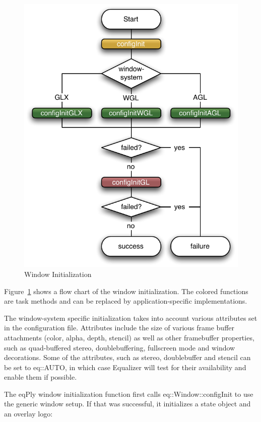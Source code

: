 \documentclass[10pt,a4]{scrartcl}
\newcommand{\fig}[1]{Figure~\ref{#1}}
\begin{document}
\begin{figure}
  \includegraphics[width=.382\textwidth]{images/windowInit.pdf}
  {\caption{\small\label{fWindowInit}Window Initialization}}
\end{figure}
\fig{fWindowInit} shows a flow chart of the window initialization. The
colored functions are task methods and can be replaced by
application-specific implementations.

The window-system specific initialization takes into account various
attributes set in the configuration file. Attributes include the size of
various frame buffer attachments (color, alpha, depth, stencil) as well
as other framebuffer properties, such as quad-buffered stereo,
doublebuffering, fullscreen mode and window decorations. Some of the
attributes, such as stereo, doublebuffer and stencil can be set to
\textsf{eq::AUTO}, in which case Equalizer will test for their availability and 
enable them if possible.

The \textsf{eqPly} window initialization function first calls
\textsf{eq::Window::configInit} to use the generic window setup. If that
was successful, it initializes a state object and an overlay logo:
\end{document}
